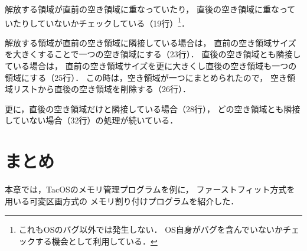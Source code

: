 解放する領域が直前の空き領域に重なっていたり，
直後の空き領域に重なっていたりしていないかチェックしている（19行）\footnote{
  これもOSのバグ以外では発生しない．
  OS自身がバグを含んでいないかチェックする機会として利用している．}．

解放する領域が直前の空き領域に隣接している場合は，
直前の空き領域サイズを大きくすることで一つの空き領域にする（23行）．
直後の空き領域とも隣接している場合は，
直前の空き領域サイズを更に大きくし直後の空き領域も一つの領域にする（25行）．
この時は，空き領域が一つにまとめられたので，
空き領域リストから直後の空き領域を削除する（26行）．

更に，直後の空き領域だけと隣接している場合（28行），
どの空き領域とも隣接していない場合（32行）の処理が続いている．

\section{まとめ}
本章では，TacOSのメモリ管理プログラムを例に，
ファーストフィット方式を用いる可変区画方式の
メモリ割り付けプログラムを紹介した．
